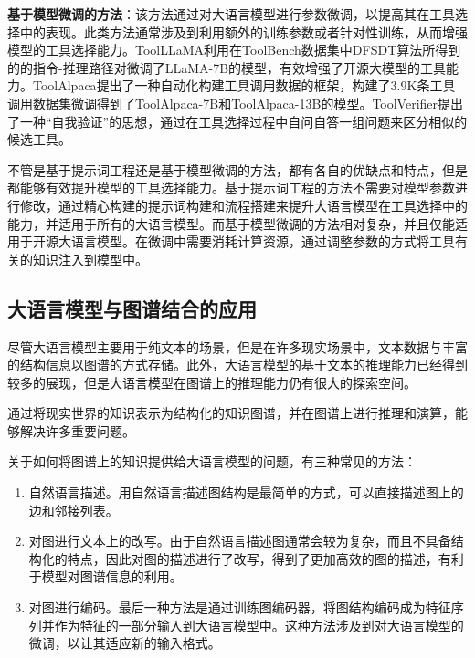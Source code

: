 \textbf{基于模型微调的方法}：该方法通过对大语言模型进行参数微调，以提高其在工具选择中的表现。此类方法通常涉及到利用额外的训练参数或者针对性训练，从而增强模型的工具选择能力。ToolLLaMA\cite{Qin2023}利用在ToolBench数据集中DFSDT算法所得到的的指令-推理路径对微调了LLaMA-7B的模型，有效增强了开源大模型的工具能力。ToolAlpaca\cite{Tang2023}提出了一种自动化构建工具调用数据的框架，构建了3.9K条工具调用数据集微调得到了ToolAlpaca-7B和ToolAlpaca-13B的模型。ToolVerifier\cite{Mekala2024}提出了一种“自我验证”的思想，通过在工具选择过程中自问自答一组问题来区分相似的候选工具。

不管是基于提示词工程还是基于模型微调的方法，都有各自的优缺点和特点，但是都能够有效提升模型的工具选择能力。基于提示词工程的方法不需要对模型参数进行修改，通过精心构建的提示词构建和流程搭建来提升大语言模型在工具选择中的能力，并适用于所有的大语言模型。而基于模型微调的方法相对复杂，并且仅能适用于开源大语言模型。在微调中需要消耗计算资源，通过调整参数的方式将工具有关的知识注入到模型中。

\subsection{大语言模型与图谱结合的应用}

尽管大语言模型主要用于纯文本的场景，但是在许多现实场景中，文本数据与丰富的结构信息以图谱的方式存储。此外，大语言模型的基于文本的推理能力已经得到较多的展现，但是大语言模型在图谱上的推理能力仍有很大的探索空间。

通过将现实世界的知识表示为结构化的知识图谱，并在图谱上进行推理和演算，能够解决许多重要问题。

关于如何将图谱上的知识提供给大语言模型的问题，有三种常见的方法：

\begin{enumerate}
    \item 自然语言描述。用自然语言描述图结构是最简单的方式，可以直接描述图上的边和邻接列表。
    \item 对图进行文本上的改写。由于自然语言描述图通常会较为复杂，而且不具备结构化的特点，因此对图的描述进行了改写，得到了更加高效的图的描述，有利于模型对图谱信息的利用。
    \item 对图进行编码。最后一种方法是通过训练图编码器，将图结构编码成为特征序列并作为特征的一部分输入到大语言模型中。这种方法涉及到对大语言模型的微调，以让其适应新的输入格式。
\end{enumerate}

